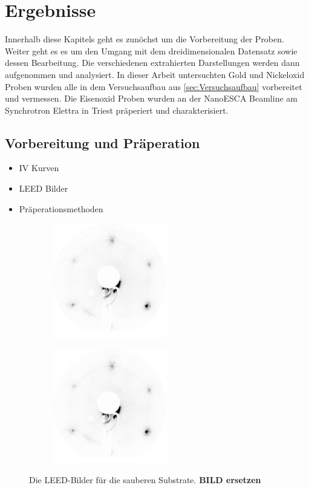 \chapter{Ergebnisse}
    Innerhalb diese Kapitels geht es zunöchst um die Vorbereitung der Proben.
    Weiter geht es es um den Umgang mit dem dreidimensionalen Datensatz sowie dessen Bearbeitung.
    Die verschiedenen extrahierten Darstellungen werden dann aufgenommen und analysiert.
    In dieser Arbeit untersuchten Gold und Nickeloxid Proben wurden alle in dem Versuchsaufbau aus \autoref{sec:Versuchsaufbau} vorbereitet und vermessen.
    Die Eisenoxid Proben wurden an der NanoESCA Beamline am Synchrotron Elettra in Triest präperiert und charakterisiert.

    \section{Vorbereitung und Präperation}
    \label{sec:Praep}
    \begin{itemize}
        \item IV Kurven
        \item LEED Bilder
        \item Präperationsmethoden
    \end{itemize}
        \begin{figure}
            \centering
            \begin{subfigure}{0.48\textwidth}
                \centering
                \includegraphics[height=5cm]{./content/pictures/2021_06_08_002_Au(111)_75eV}
            \end{subfigure}
            \begin{subfigure}{0.48\textwidth}
                \centering
                \includegraphics[height=5cm]{./content/pictures/2021_06_08_002_Au(111)_75eV}
            \end{subfigure}
            \caption{Die LEED-Bilder für die sauberen Substrate. \textbf{BILD ersetzen}}
        \label{fig:Substrate}
        \end{figure}
